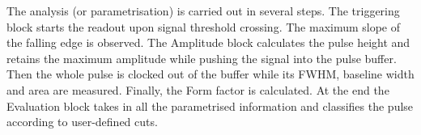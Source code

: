 \documentclass[12pt]{mytustyle}  %
\begin{document}

The analysis (or parametrisation) is carried out in several steps. The triggering block starts the readout upon signal threshold crossing. The maximum slope of the falling edge is observed. The Amplitude block calculates the pulse height and retains the maximum amplitude while pushing the signal into the pulse buffer. Then the whole pulse is clocked out of the buffer while its FWHM, baseline width and area are measured. Finally, the Form factor is calculated. At the end the Evaluation block takes in all the parametrised information and classifies the pulse according to user-defined cuts. 
\end{document}
